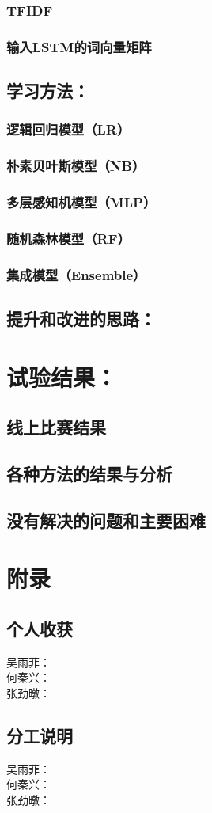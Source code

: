 \documentclass{article}
\begin{document}
     \subsubsection{TFIDF}
     \subsubsection{输入LSTM的词向量矩阵}
    \subsection{学习方法：}
   	 \subsubsection{逻辑回归模型（LR）}
   	 \subsubsection{朴素贝叶斯模型（NB）}
   	 \subsubsection{多层感知机模型（MLP）}
   	 \subsubsection{随机森林模型（RF）}
   	 \subsubsection{集成模型（Ensemble）}
    \subsection{提升和改进的思路：}
   \section{试验结果：}
   	\subsection{线上比赛结果}
   	\subsection{各种方法的结果与分析}
   	\subsection{没有解决的问题和主要困难}
   \section{附录}
    \subsection{个人收获}
    吴雨菲：\\
    何秦兴：\\
    张劲暾：
   	\subsection{分工说明}
 	吴雨菲：\\
    何秦兴：\\
    张劲暾：
\end{document}
